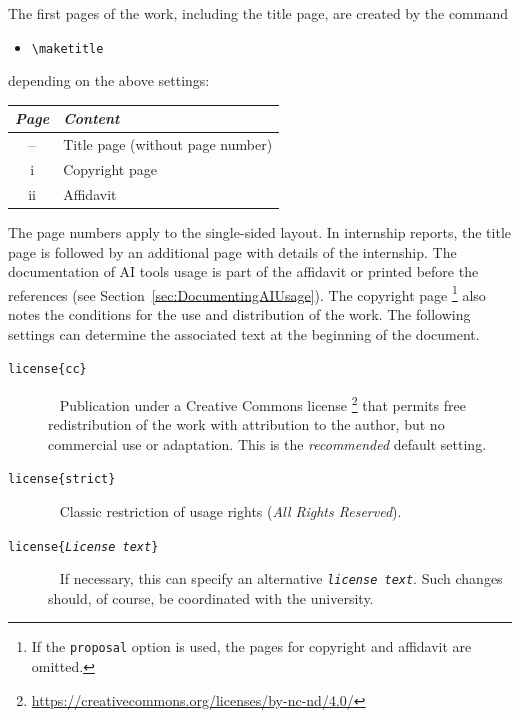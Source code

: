 The first pages of the work, including the title page, are created by the
command
%
\begin{itemize}
    \item[] \verb!\maketitle!
\end{itemize}
%
depending on the above settings:
%
\begin{center}
    \begin{tabular}{@{}cl@{}}
        \toprule
        \emph{Page} & \emph{Content} \\
        \midrule
        --           & Title page (without page number) \\
        \textrm{i}   & Copyright page \\
        \textrm{ii}  & Affidavit \\
        \bottomrule
    \end{tabular}
\end{center}
%
The page numbers apply to the single-sided layout. In internship reports, the
title page is followed by an additional page with details of the internship.
The documentation of AI tools usage is part of the affidavit or printed before
the references (see Section~\ref{sec:DocumentingAIUsage}).
The copyright page%
\footnote{If the \texttt{proposal} option is used, the pages for copyright and
affidavit are omitted.}
also notes the conditions for the use and distribution of the work. The
following settings can determine the associated text at the beginning of the
document.
%
\begin{description}
    \item[\normalfont\texttt{{\bs}license\{cc\}}] ~ \newline
    Publication under a Creative Commons license%
    \footnote{\url{https://creativecommons.org/licenses/by-nc-nd/4.0/}}
    that permits free redistribution of the work with attribution to the author,
    but no commercial use or adaptation. This is the \emph{recommended} default
    setting.
    \item[\normalfont\texttt{{\bs}license\{strict\}}] ~ \newline
    Classic restriction of usage rights (\emph{All Rights Reserved}).
    \item[\normalfont\texttt{{\bs}license\{\emph{License text}\}}] ~ \newline
    If necessary, this can specify an alternative \texttt{\emph{license text}}.
    Such changes should, of course, be coordinated with the university.
\end{description}


